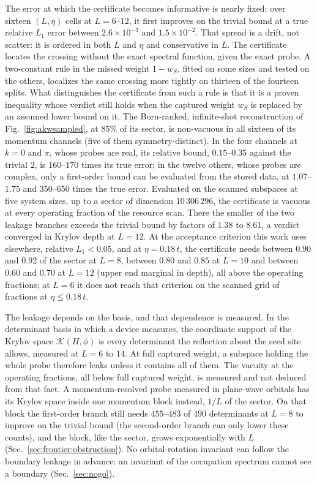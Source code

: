 %
%
%
%
%
The error at which the certificate becomes informative is nearly fixed: over sixteen $(L,\eta)$ cells at
$L=6$--$12$, it first improves on the trivial bound at a true relative $L_1$ error between
$2.6\times10^{-3}$ and $1.5\times10^{-2}$. That
spread is a drift, not scatter: it is ordered in both $L$ and $\eta$ and conservative in $L$. The
certificate locates the crossing without the exact spectral function, given the exact probe. A
two-constant rule in the missed weight $1-w_S$, fitted on some sizes and tested on the others,
localizes the same crossing more tightly on thirteen of the fourteen splits. What distinguishes the
certificate from such a rule is that it is a proven inequality whose verdict still holds when
the captured weight $w_S$ is replaced by an assumed lower bound on it. The Born-ranked,
infinite-shot reconstruction of Fig.~\ref{fig:akwsampled}, at $85\%$ of its sector, is non-vacuous in
all sixteen of its momentum channels (five of them symmetry-distinct). In the four channels at $k=0$ and $\pi$,
whose probes are real, its relative bound, $0.15$--$0.35$ against the trivial $2$, is $160$--$170$ times its true
error; in the twelve others, whose probes are complex, only a first-order bound can be evaluated from the stored
data, at $1.07$--$1.75$ and $350$--$650$ times the true error. Evaluated on the scanned subspaces at five system sizes, up to a
sector of dimension $10\,306\,296$, the certificate is vacuous at every operating fraction of the resource
scan. There the smaller of the two leakage branches exceeds the trivial bound by factors of $1.38$ to $8.61$, a verdict converged
in Krylov depth at $L=12$.
%
%
At the acceptance criterion this work uses elsewhere, relative $L_1<0.05$, and at $\eta=0.18\,t$, the certificate
needs between $0.90$ and $0.92$ of the sector at $L=8$, between $0.80$ and $0.85$ at $L=10$ and between $0.60$ and
$0.70$ at $L=12$ (upper end marginal in depth), all above the operating fractions; at $L=6$ it does not reach
that criterion on the scanned grid of fractions at $\eta\le0.18\,t$.

The leakage depends on the basis, and that dependence is measured. In the determinant basis in
which a device measures, the coordinate support of the Krylov space $\mathcal K(H,\phi)$ is every
determinant the reflection about the seed site allows, measured at $L=6$ to $14$. At full captured
weight, a subspace holding the whole probe therefore leaks unless it contains all of them. The
vacuity at the operating fractions, all below full captured weight, is measured and not deduced from
that fact. A momentum-resolved probe measured in plane-wave orbitals has its Krylov space inside one
momentum block instead, $1/L$ of the sector. On that block the first-order branch still needs $455$--$483$
of $490$ determinants at $L=8$ to improve on the trivial bound (the second-order branch can only lower these
counts), and the block, like the sector, grows exponentially with $L$
(Sec.~\ref{sec:frontier:obstruction}). No orbital-rotation invariant can follow the boundary leakage in
advance: an invariant of the occupation spectrum cannot see a boundary (Sec.~\ref{sec:nogo}).


